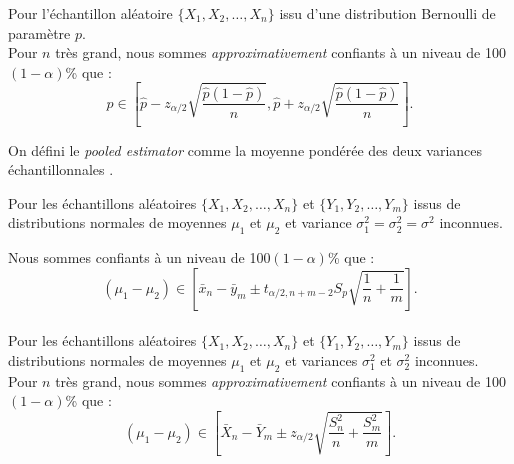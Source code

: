 \documentclass[10pt, french]{article}
\begin{document}
\begin{multicols*}{2}
\begin{definitionNOHFILLsub}
Pour l'échantillon aléatoire $\{X_{1}, X_{2}, \dots, X_{n}\}$ issu d'une distribution Bernoulli de paramètre $p$.\\

Pour $n$ très grand, nous sommes \textit{approximativement} confiants à un niveau de 100$(1 - \alpha)$\% que :
\begin{equation*}
	p \in \left[ \hat{p} - z_{\alpha/2} \sqrt{\frac{\hat{p}(1 - \hat{p})}{n}}, \hat{p} + z_{\alpha/2} \sqrt{\frac{\hat{p}(1 - \hat{p})}{n}}\right].
\end{equation*}
\end{definitionNOHFILLsub}

On défini le \og \textit{pooled estimator} \fg{} comme la moyenne pondérée des deux variances échantillonnales .\\


\begin{definitionNOHFILLsub}
Pour les échantillons aléatoires $\{X_{1}, X_{2}, \dots, X_{n}\}$ et $\{Y_{1}, Y_{2}, \dots, Y_{m}\}$ issus de distributions normales de moyennes $\mu_{1}$ et $\mu_{2}$ et variance $\sigma^{2}_{1} = \sigma^{2}_{2} = \sigma^{2}$ inconnues.

Nous sommes confiants à un niveau de 100$(1 - \alpha)$\% que :
\begin{equation*}
	(\mu_{1}	-	\mu_{2}) \in \left[ 
	\bar{x}_{n}	-	\bar{y}_{m}
	\pm	t_{\alpha/2, n + m - 2} S_{p}\sqrt{\frac{1}{n} + \frac{1}{m}} \right].
\end{equation*}
\begin{align*}
\end{align*}
\end{definitionNOHFILLsub}

\begin{definitionNOHFILLsub}
Pour les échantillons aléatoires $\{X_{1}, X_{2}, \dots, X_{n}\}$ et $\{Y_{1}, Y_{2}, \dots, Y_{m}\}$ issus de distributions normales de moyennes $\mu_{1}$ et $\mu_{2}$ et variances $\sigma^{2}_{1}$ et $\sigma^{2}_{2}$ inconnues.\\

Pour $n$ très grand, nous sommes \textit{approximativement} confiants à un niveau de 100$(1 - \alpha)$\% que :
\begin{equation*}
	(\mu_{1}	-	\mu_{2}) \in \left[ 
	\bar{X}_{n}	-	\bar{Y}_{m}
	\pm	z_{\alpha/2} \sqrt{\frac{S_{n}^{2}}{n} + \frac{S_{m}^{2}}{m}} \right].
\end{equation*}
\begin{align*}
\end{align*}
\end{definitionNOHFILLsub}


\end{multicols*}
\end{document}
